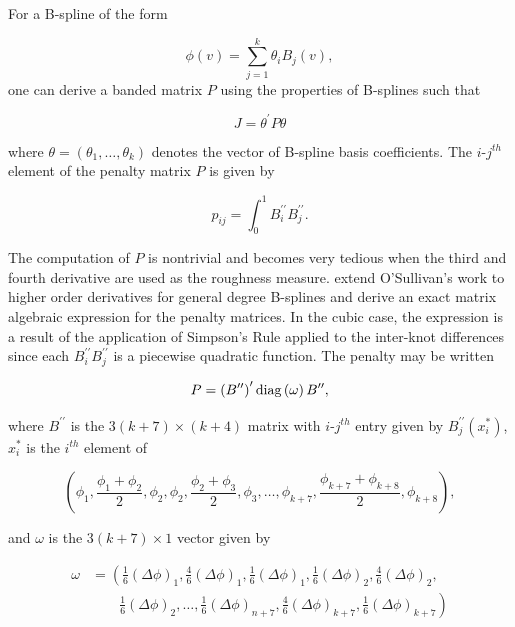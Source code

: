 For a B-spline of the form

\[
\phi\left(v\right) = \sum\limits_{j=1}^k \theta_i B_j\left(v\right),
\]
\noindent
one can derive a banded matrix $P$ using the properties of B-splines such that 

 \[
 J = \theta^\prime P \theta
 \] 
 
 \noindent
 where $\theta = \left(\theta_1,\dots, \theta_k\right)$ denotes the vector of B-spline basis coefficients. The $i$-$j^{th}$ element of the penalty matrix $P$ is given by
 
 \[
 p_{ij} = \int_0^1 B_i^{\prime \prime} B_j^{\prime \prime}.
 \]

The computation of $P$ is nontrivial and becomes very tedious when the third and fourth derivative are used as the roughness measure. \cite{wand2008semiparametric} extend O'Sullivan's work to higher order derivatives for general degree B-splines and derive an exact matrix algebraic expression for the penalty matrices. In the cubic case, the expression is a result of the application of Simpson's Rule applied to the inter-knot differences since each $B_i^{\prime \prime} B_j^{\prime \prime}$ is a piecewise quadratic function. The penalty may be written

 \[
 P = \left(B^{\prime \prime}\right)^\prime \textup{diag}\left(\omega \right) B^{\prime \prime}, 
 \]
 
 \noindent
 where $B^{\prime \prime}$ is the $3\left( k + 7 \right) \times \left( k + 4 \right)$ matrix with $i$-$j^{th}$ entry given by $B_j^{\prime \prime} \left(x_i^*\right)$, $x^*_i$ is the $i^{th}$ element of 
 
\[
\left( \phi_1,\frac{\phi_1+\phi_2}{2},\phi_2,\phi_2,\frac{\phi_2+\phi_3}{2},\phi_3,\dots,\phi_{k+7},\frac{\phi_{k+7}+\phi_{k+8}}{2},\phi_{k+8} \right),
\]

 \noindent
 and $\omega$ is the $3\left(k+7\right) \times 1$ vector given by
 
\begin{align*}
\omega &= \left( \frac{1}{6}\left(\Delta \phi \right)_1,\frac{4}{6}\left(\Delta \phi \right)_1, \frac{1}{6}\left(\Delta \phi \right)_1,\frac{1}{6}\left(\Delta \phi \right)_2, \frac{4}{6}\left(\Delta \phi \right)_2,  \right. \\
&\qquad   \left. {} \frac{1}{6}\left(\Delta \phi \right)_2 , \dots , \frac{1}{6}\left(\Delta \phi \right)_{n+7}, \frac{4}{6}\left(\Delta \phi \right)_{k+7}, \frac{1}{6}\left(\Delta \phi \right)_{k+7}  \right) \\
\end{align*}

